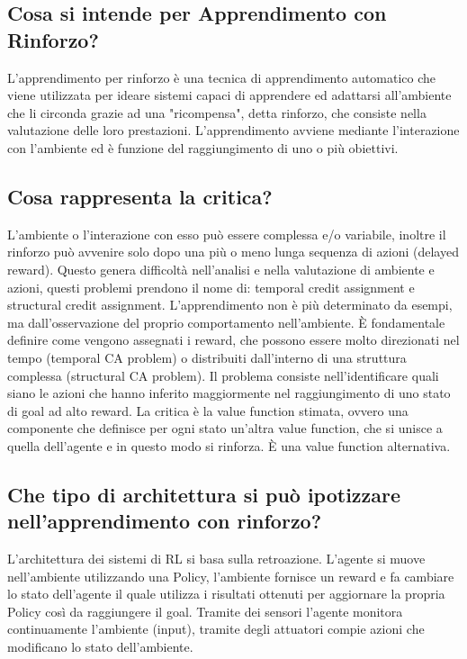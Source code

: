 \documentclass[\main/main.tex]{subfiles}
\begin{document}
\subsection{Cosa si intende per Apprendimento con Rinforzo?}
L'apprendimento per rinforzo è una tecnica di apprendimento automatico che viene utilizzata per ideare sistemi capaci di apprendere ed adattarsi all'ambiente che li circonda grazie ad una "ricompensa", detta rinforzo, che consiste nella valutazione delle loro prestazioni. L'apprendimento avviene mediante l'interazione con l'ambiente ed è funzione del raggiungimento di uno o più obiettivi.



\subsection{Cosa rappresenta la critica?}
L'ambiente o l'interazione con esso può essere complessa e/o variabile, inoltre il rinforzo può avvenire solo dopo una più o meno lunga sequenza di azioni (delayed reward).
Questo genera difficoltà nell'analisi e nella valutazione di ambiente e azioni, questi problemi prendono il nome di: temporal credit assignment e structural credit assignment.
L'apprendimento non è più determinato da esempi, ma dall'osservazione del proprio comportamento nell'ambiente.
È fondamentale definire come vengono assegnati i reward, che possono essere molto direzionati nel tempo (temporal CA problem) o distribuiti dall'interno di una struttura complessa (structural CA problem).
Il problema consiste nell'identificare quali siano le azioni che hanno inferito maggiormente nel raggiungimento di uno stato di goal ad alto reward.
La critica è la value function stimata, ovvero una componente che definisce per ogni stato un'altra value function, che si unisce a quella dell'agente e in questo modo si rinforza. È una value function alternativa.

\subsection{Che tipo di architettura si può ipotizzare nell'apprendimento con rinforzo?}
L'architettura dei sistemi di RL si basa sulla retroazione. L'agente si muove nell'ambiente utilizzando una Policy, l'ambiente fornisce un reward e fa cambiare lo stato dell'agente il quale utilizza i risultati ottenuti per aggiornare la propria Policy così da raggiungere il goal.
Tramite dei sensori l'agente monitora continuamente l'ambiente (input), tramite degli attuatori compie azioni che modificano lo stato dell'ambiente.
\end{document}
